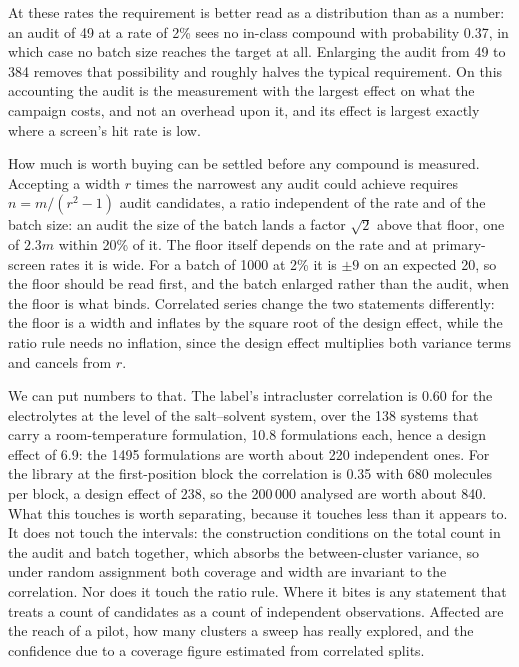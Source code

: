 \documentclass[twocolumn,10pt]{article}
\begin{document}
At these rates the requirement is better read as a distribution than as a number: an audit of
49 at a rate of 2\% sees no in-class compound with probability 0.37, in which case no batch size
reaches the target at all. Enlarging the audit from 49 to 384 removes that possibility and
roughly halves the typical requirement. On this accounting the audit is the measurement with the largest effect on what the campaign costs, and not an overhead upon it, and its effect
is largest exactly where a screen's hit rate is low.

How much is worth buying can be settled before any compound is measured. Accepting a width $r$
times the narrowest any audit could achieve requires $n=m/(r^2-1)$ audit candidates, a ratio
independent of the rate and of the batch size: an audit the size of the batch lands a factor
$\sqrt2$ above that floor, one of $2.3m$ within 20\% of it. The floor itself depends on the
rate and at primary-screen rates it is wide. For a batch of 1000 at 2\% it is $\pm9$ on an expected 20, so the floor should be read first, and the batch enlarged rather than the audit, when the floor is what binds. Correlated series change the two statements differently: the
floor is a width and inflates by the square root of the design effect, while the ratio rule
needs no inflation, since the design effect multiplies both variance terms and cancels from
$r$.\citep{Cochran1977,Kish1965}

We can put numbers to that. The label's intracluster correlation is 0.60 for the electrolytes at
the level of the salt--solvent system, over the 138 systems that carry a room-temperature
formulation, 10.8 formulations each, hence a design effect of 6.9: the 1495 formulations are
worth about 220 independent ones. For the library at the first-position block the correlation is
0.35 with 680 molecules per block, a design effect of 238, so the 200\,000 analysed are worth
about 840. What this touches is worth separating, because it touches less than it appears to. It
does not touch the intervals: the construction conditions on the total count in the audit and
batch together, which absorbs the between-cluster variance, so under random assignment both
coverage and width are invariant to the correlation. Nor does it touch the ratio rule. Where it
bites is any statement that treats a count of candidates as a count of independent observations. Affected are the reach of a pilot, how many clusters a sweep has really explored, and the confidence due
to a coverage figure estimated from correlated splits.
\end{document}
